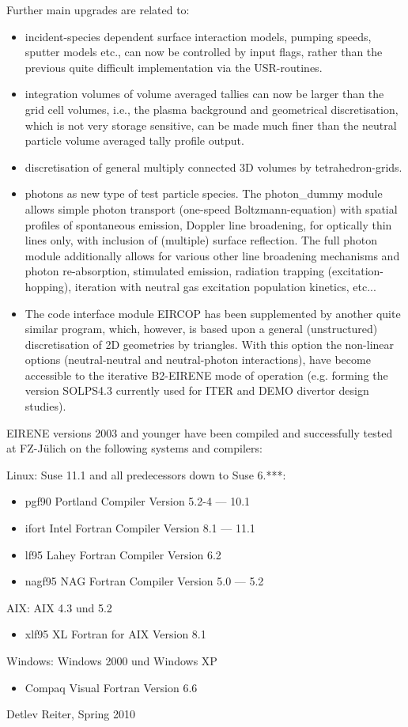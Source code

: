 Further main upgrades are related to:
\begin{itemize}
\item incident-species dependent surface interaction models,
pumping speeds, sputter models etc., can now be controlled by
input flags, rather than the previous quite difficult
implementation via the USR-routines.
\item integration volumes of
volume averaged tallies can now be larger than the grid cell
volumes, i.e., the plasma background and geometrical
discretisation, which is not very storage sensitive, can be made
much finer than the neutral particle volume averaged tally profile
output.
\item discretisation of general multiply connected 3D
volumes by tetrahedron-grids.
\item photons as new type of test
particle species. The photon\_dummy module allows simple photon
transport (one-speed Boltzmann-equation) with spatial
profiles of spontaneous emission,
Doppler line broadening, for optically thin lines only,
with inclusion of (multiple) surface reflection. The full photon
module additionally allows for various other line broadening
mechanisms and photon re-absorption, stimulated emission,
radiation trapping (excitation-hopping), iteration with neutral
gas excitation population kinetics, etc...
\item The code interface module EIRCOP has been supplemented by another
quite similar program, which, however, is based upon a general
(unstructured) discretisation of 2D geometries by triangles. With
this option the non-linear options (neutral-neutral  and
neutral-photon interactions), have become accessible to the
iterative B2-EIRENE mode of operation (e.g. forming the version
SOLPS4.3 currently used for ITER and DEMO divertor design studies).
\end{itemize}

EIRENE versions 2003 and younger have been compiled and
successfully tested at FZ-J{\"u}lich on the following systems and
compilers:

Linux: Suse 11.1 and all predecessors down to Suse 6.***:
\begin{itemize}
\item pgf90 Portland Compiler Version 5.2-4  --- 10.1
\item ifort Intel Fortran Compiler
Version 8.1 --- 11.1
\item lf95 Lahey Fortran Compiler Version 6.2
\item nagf95  NAG Fortran Compiler Version 5.0 --- 5.2
\end{itemize}
AIX: AIX 4.3 und 5.2
\begin{itemize}
\item xlf95   XL Fortran for AIX Version 8.1
\end{itemize}
Windows: Windows 2000 und Windows XP
\begin{itemize}
\item Compaq Visual Fortran Version 6.6
\end{itemize}




Detlev Reiter, Spring         2010
